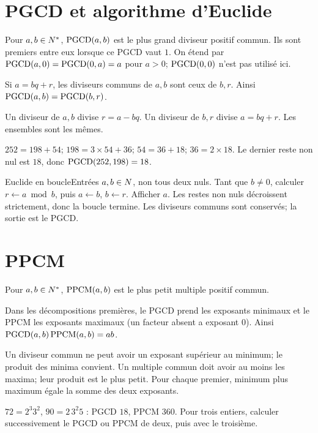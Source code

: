 \section{PGCD et algorithme d’Euclide}
\begin{definition}Pour $a,b\in N^*$, $\operatorname{PGCD}(a,b)$ est le plus grand diviseur positif commun. Ils sont premiers entre eux lorsque ce PGCD vaut $1$. On étend par $\operatorname{PGCD}(a,0)=\operatorname{PGCD}(0,a)=a$ pour $a>0$; $\operatorname{PGCD}(0,0)$ n’est pas utilisé ici.\end{definition}
\begin{propriete}Si $a=bq+r$, les diviseurs communs de $a,b$ sont ceux de $b,r$. Ainsi $\operatorname{PGCD}(a,b)=\operatorname{PGCD}(b,r)$.\end{propriete}
\begin{demonstration}Un diviseur de $a,b$ divise $r=a-bq$. Un diviseur de $b,r$ divise $a=bq+r$. Les ensembles sont les mêmes.\end{demonstration}
\begin{exemple}$252=198+54$; $198=3\times54+36$; $54=36+18$; $36=2\times18$. Le dernier reste non nul est $18$, donc $\operatorname{PGCD}(252,198)=18$.\end{exemple}
\begin{methode}{Euclide en boucle}Entrées $a,b\in N$, non tous deux nuls. Tant que $b\ne0$, calculer $r\leftarrow a\bmod b$, puis $a\leftarrow b$, $b\leftarrow r$. Afficher $a$. Les restes non nuls décroissent strictement, donc la boucle termine. Les diviseurs communs sont conservés; la sortie est le PGCD.\end{methode}
\section{PPCM}
\begin{definition}Pour $a,b\in N^*$, $\operatorname{PPCM}(a,b)$ est le plus petit multiple positif commun.\end{definition}
\begin{propriete}Dans les décompositions premières, le PGCD prend les exposants minimaux et le PPCM les exposants maximaux (un facteur absent a exposant $0$). Ainsi $\operatorname{PGCD}(a,b)\operatorname{PPCM}(a,b)=ab$.\end{propriete}
\begin{demonstration}Un diviseur commun ne peut avoir un exposant supérieur au minimum; le produit des minima convient. Un multiple commun doit avoir au moins les maxima; leur produit est le plus petit. Pour chaque premier, minimum plus maximum égale la somme des deux exposants.\end{demonstration}
\begin{exemple}$72=2^3 3^2$, $90=2\,3^2 5$ : PGCD $18$, PPCM $360$. Pour trois entiers, calculer successivement le PGCD ou PPCM de deux, puis avec le troisième.\end{exemple}

